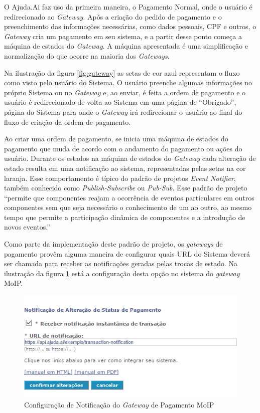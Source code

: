 O Ajuda.Ai faz uso da primeira maneira, o Pagamento Normal, onde o usuário é redirecionado ao \emph{Gateway}. Após a criação do pedido de pagamento e o preenchimento das informações necessárias, como dados pessoais, CPF e outros, o \emph{Gateway} cria um pagamento em seu sistema, e a partir desse ponto começa a máquina de estados do \emph{Gateway}. A máquina apresentada é uma simplificação e normalização do que ocorre na maioria dos \emph{Gateways}.

Na ilustração da figura \ref{fig:gateway} as setas de cor azul representam o fluxo como visto pelo usuário do Sistema. O usuário preenche algumas informações no próprio Sistema ou no \emph{Gateway} e, ao enviar, é feita a ordem de pagamento e o usuário é redirecionado de volta ao Sistema em uma página de ``Obrigado'', página do Sistema para onde o \emph{Gateway} irá redirecionar o usuário ao final do fluxo de criação da ordem de pagamento.

Ao criar uma ordem de pagamento, se inicia uma máquina de estados do pagamento que muda de acordo com o andamento do pagamento ou ações do usuário. Durante os estados na máquina de estados do \emph{Gateway} cada alteração de estado resulta em uma notificação ao sistema, representadas pelas setas na cor laranja. Esse comportamento é típico do padrão de projetos \emph{Event Notifier}, também conhecido como \emph{Publish-Subscribe} ou \emph{Pub-Sub}. Esse padrão de projeto ``permite que componentes reajam a ocorrência de eventos particulares em outros componentes sem que seja necessário o conhecimento de um ao outro, ao mesmo tempo que permite a participação dinâmica de componentes e a introdução de novos eventos.'' \cite{gupta2000event}

Como parte da implementação deste padrão de projeto, os \emph{gateways} de pagamento provêm alguma maneira de configurar quais URL do Sistema deverá ser chamada para receber as notificações geradas pelas trocas de estado. Na ilustração da figura \ref{fig:config_moip} está a configuração desta opção no sistema do \emph{gateway} MoIP.

\begin{figure}[H]
	\caption{\label{fig:config_moip}Configuração de Notificação do \emph{Gateway} de Pagamento MoIP}
    \centering
    \includegraphics[scale=0.85]{imagens/config-moip.png}
\end{figure}

